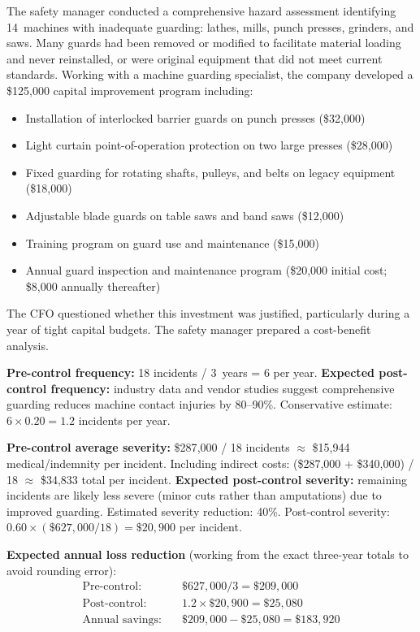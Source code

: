 \documentclass[11pt,openany]{book}
\providecommand{\tightlist}{\setlength{\itemsep}{0pt}\setlength{\parskip}{0pt}}
\begin{document}
The safety manager conducted a comprehensive hazard assessment identifying
14~machines with inadequate guarding: lathes, mills, punch presses, grinders,
and saws. Many guards had been removed or modified to facilitate material
loading and never reinstalled, or were original equipment that did not meet
current standards. Working with a machine guarding specialist, the company
developed a \$125{,}000 capital improvement program including:

\begin{itemize}\tightlist
  \item Installation of interlocked barrier guards on punch presses
        (\$32{,}000)
  \item Light curtain point-of-operation protection on two large presses
        (\$28{,}000)
  \item Fixed guarding for rotating shafts, pulleys, and belts on legacy
        equipment (\$18{,}000)
  \item Adjustable blade guards on table saws and band saws (\$12{,}000)
  \item Training program on guard use and maintenance (\$15{,}000)
  \item Annual guard inspection and maintenance program (\$20{,}000 initial
        cost; \$8{,}000 annually thereafter)
\end{itemize}

The CFO questioned whether this investment was justified, particularly during
a year of tight capital budgets. The safety manager prepared a cost-benefit
analysis.

\textbf{Pre-control frequency:} 18 incidents / 3~years = 6 per year.
\textbf{Expected post-control frequency:} industry data and vendor studies
suggest comprehensive guarding reduces machine contact injuries by 80--90\%.
Conservative estimate: \(6 \times 0.20 = 1.2\) incidents per year.

\textbf{Pre-control average severity:} \$287{,}000 / 18 incidents
\(\approx\) \$15{,}944 medical/indemnity per incident. Including indirect
costs: (\$287{,}000 + \$340{,}000) / 18 \(\approx\) \$34{,}833 total per
incident.
\textbf{Expected post-control severity:} remaining incidents are likely less
severe (minor cuts rather than amputations) due to improved guarding.
Estimated severity reduction: 40\%. Post-control severity:
\(0.60 \times (\$627{,}000 / 18) = \$20{,}900\) per incident.

\textbf{Expected annual loss reduction} (working from the exact three-year
totals to avoid rounding error):
\begin{align*}
\text{Pre-control:} \quad & \$627{,}000 / 3 = \$209{,}000 \\
\text{Post-control:} \quad & 1.2 \times \$20{,}900 = \$25{,}080 \\
\text{Annual savings:} \quad & \$209{,}000 - \$25{,}080 = \$183{,}920
\end{align*}
\end{document}

